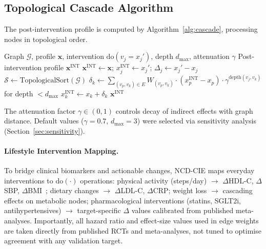 \documentclass[runningheads]{llncs}
\begin{document}
\subsection{Topological Cascade Algorithm}\label{sec:cascade}

The post-intervention profile is computed by
Algorithm~\ref{alg:cascade}, processing nodes in topological order.

\begin{algorithm}[t]
\caption{Topological Intervention Cascade}
\label{alg:cascade}
\begin{algorithmic}[1]
\REQUIRE Graph $\mathcal{G}$, profile $\mathbf{x}$, intervention
  $\mathrm{do}(v_j = x_j')$, depth $d_{\max}$, attenuation $\gamma$
\ENSURE Post-intervention profile $\mathbf{x}^{\mathrm{INT}}$
\STATE $\mathbf{x}^{\mathrm{INT}} \leftarrow \mathbf{x}$;
  $x_j^{\mathrm{INT}} \leftarrow x_j'$;
  $\Delta_j \leftarrow x_j' - x_j$
\STATE $\mathcal{S} \leftarrow \text{TopologicalSort}(\mathcal{G})$
  \STATE $\delta_k \leftarrow \sum_{(v_p, v_k) \in E} W_{(v_p,v_k)} \cdot (x_p^{\mathrm{INT}} - x_p) \cdot \gamma^{\text{depth}(v_j,v_k)}$ for depth $< d_{\max}$
  \STATE $x_k^{\mathrm{INT}} \leftarrow x_k + \delta_k$
\ENDFOR
\RETURN $\mathbf{x}^{\mathrm{INT}}$
\end{algorithmic}
\end{algorithm}

The attenuation factor $\gamma \in (0,1)$ controls decay of indirect
effects with graph distance.  Default values ($\gamma = 0.7$,
$d_{\max} = 3$) were selected via sensitivity analysis
(Section~\ref{sec:sensitivity}).

\paragraph{Lifestyle Intervention Mapping.}
To bridge clinical biomarkers and actionable changes, NCD-CIE maps
everyday interventions to $\mathrm{do}(\cdot)$ operations: physical
activity (steps/day) $\rightarrow$ $\Delta$HDL-C, $\Delta$SBP,
$\Delta$BMI~\cite{naci2018comparative}; dietary changes $\rightarrow$
$\Delta$LDL-C, $\Delta$CRP; weight loss $\rightarrow$ cascading
effects on metabolic nodes; pharmacological interventions (statins,
SGLT2i, antihypertensives) $\rightarrow$ target-specific $\Delta$
values calibrated from published meta-analyses.  Importantly, all
hazard ratio and effect-size values used in edge weights are taken
directly from published RCTs and meta-analyses, not tuned to optimise
agreement with any validation target.
\end{document}
